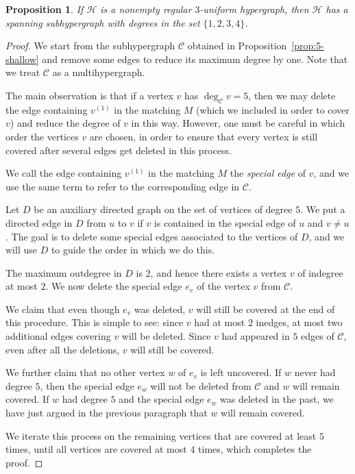 \documentclass[11pt, a4paper]{article}
\numberwithin{theorem}{section} %
\newtheorem{proposition}[theorem]{Proposition}
\theoremstyle{remark}
\theoremstyle{definition}
\def\cC{\mathcal{C}}
\def\cH{\mathcal{H}}
\begin{document}
\begin{proposition}\label{prop:4-shallow}
If $\cH$ is a nonempty regular $3$-uniform hypergraph, then $\cH$ has a spanning subhypergraph with degrees in the set $\{1, 2, 3, 4\}$.
\end{proposition}
\begin{proof}
We start from the subhypergraph $\cC$ obtained in Proposition~\ref{prop:5-shallow} and remove some edges to reduce its maximum degree by one. Note that we treat $\cC$ as a multihypergraph.

The main observation is that if a vertex $v$ has $\deg_{\cC}v=5$, then we may delete the edge containing $v^{(1)}$ in the matching $M$ (which we included in order to cover $v$) and reduce the degree of $v$ in this way. However, one must be careful in which order the vertices $v$ are chosen, in order to ensure that every vertex is still covered after several edges get deleted in this process.

We call the edge containing $v^{(1)}$ in the matching $M$ the \textit{special edge} of $v$, and we use the same term to refer to the corresponding edge in $\cC$.

Let $D$ be an auxiliary directed graph on the set of vertices of degree $5$. We put a directed edge in $D$ from $u$ to $v$ if $v$ is contained in the special edge of $u$ and $v\neq u$. The goal is to delete some special edges associated to the vertices of $D$, and we will use $D$ to guide the order in which we do this.

The maximum outdegree in $D$ is $2$, and hence there exists a vertex $v$ of indegree at most $2$. We now delete the special edge $e_v$ of the vertex $v$ from $\cC$. 

We claim that even though $e_v$ was deleted, $v$ will still be covered at the end of this procedure. This is simple to see: since $v$ had at most $2$ inedges, at most two additional edges covering $v$ will be deleted. Since $v$ had appeared in $5$ edges of $\cC$, even after all the deletions, $v$ will still be covered. 

We further claim that no other vertex $w$ of $e_v$ is left uncovered. If $w$ never had degree $5$, then the special edge $e_w$ will not be deleted from $\cC$ and $w$ will remain covered. If $w$ had degree $5$ and the special edge $e_w$ was deleted in the past, we have just argued in the previous paragraph that $w$ will remain covered.

We iterate this process on the remaining vertices that are covered at least $5$ times, until all vertices are covered at most $4$ times, which completes the proof.
\end{proof}
\end{document}
